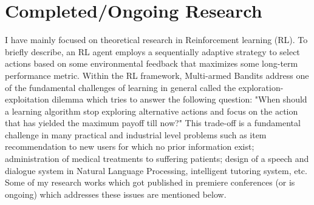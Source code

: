 \documentclass{article}
\begin{document}
\vspace*{-2.2em}
\section{Completed/Ongoing Research}
\vspace*{-1em}


I have mainly focused on theoretical research in Reinforcement learning (RL). To briefly describe, an RL agent employs a sequentially adaptive strategy to select actions based on some environmental feedback that maximizes some long-term performance metric. Within the RL framework, Multi-armed Bandits address one of the fundamental challenges of learning in general called the exploration-exploitation dilemma which tries to answer the following question: "When should a learning algorithm stop exploring alternative actions and focus on the action that has yielded the maximum payoff till now?" This trade-off is a fundamental challenge in many practical and industrial level problems such as item recommendation to new users for which no prior information exist; administration of medical treatments to suffering patients; design of a speech and dialogue system in Natural Language Processing, intelligent tutoring system, etc. Some of my research works which got published in premiere conferences (or is ongoing) which addresses these issues are mentioned below.


\end{document}
